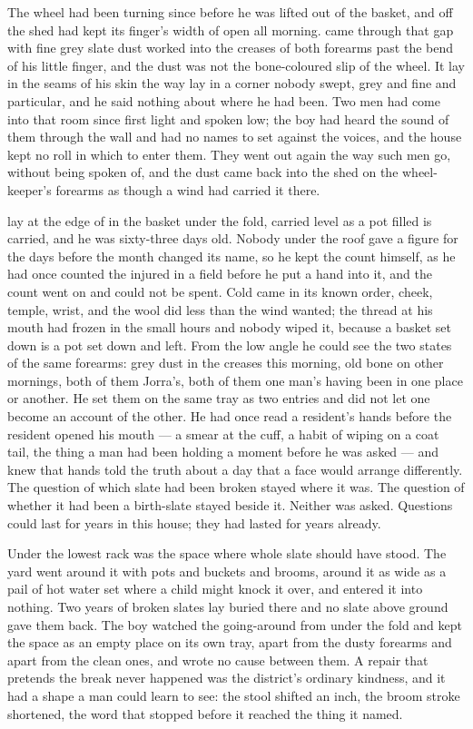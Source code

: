 
The wheel had been turning since before he was lifted out of the basket, and  off the shed had kept its finger's width of open all morning.  came through that gap with fine grey slate dust worked into the creases of both forearms past the bend of his little finger, and the dust was not the bone-coloured slip of the wheel. It lay in the seams of his skin the way  lay in a corner nobody swept, grey and fine and particular, and he said nothing about where he had been. Two men had come into that room since first light and spoken low; the boy had heard the sound of them through the wall and had no names to set against the voices, and the house kept no roll in which to enter them. They went out again the way such men go, without being spoken of, and the dust came back into the shed on the wheel-keeper's forearms as though a wind had carried it there.

 lay at the edge of  in the basket under the fold, carried level as a pot filled is carried, and he was sixty-three days old. Nobody under the roof gave a figure for the days before the month changed its name, so he kept the count himself, as he had once counted the injured in a field before he put a hand into it, and the count went on and could not be spent. Cold came in its known order, cheek, temple, wrist, and the wool did less than the wind wanted; the thread at his mouth had frozen in the small hours and nobody wiped it, because a basket set down is a pot set down and left. From the low angle he could see the two states of the same forearms: grey dust in the creases this morning, old bone on other mornings, both of them Jorra's, both of them one man's having been in one place or another. He set them on the same tray as two entries and did not let one become an account of the other. He had once read a resident's hands before the resident opened his mouth --- a smear at the cuff, a habit of wiping on a coat tail, the thing a man had been holding a moment before he was asked --- and knew that hands told the truth about a day that a face would arrange differently. The question of which slate had been broken stayed where it was. The question of whether it had been a birth-slate stayed beside it. Neither was asked. Questions could last for years in this house; they had lasted for years already.

Under the lowest rack was the space where whole slate should have stood. The yard went around it with pots and buckets and brooms, around it as wide as a pail of hot water set where a child might knock it over, and entered it into nothing. Two years of broken slates lay buried there and no slate above ground gave them back. The boy watched the going-around from under the fold and kept the space as an empty place on its own tray, apart from the dusty forearms and apart from the clean ones, and wrote no cause between them. A repair that pretends the break never happened was the district's ordinary kindness, and it had a shape a man could learn to see: the stool shifted an inch, the broom stroke shortened, the word that stopped before it reached the thing it named.

